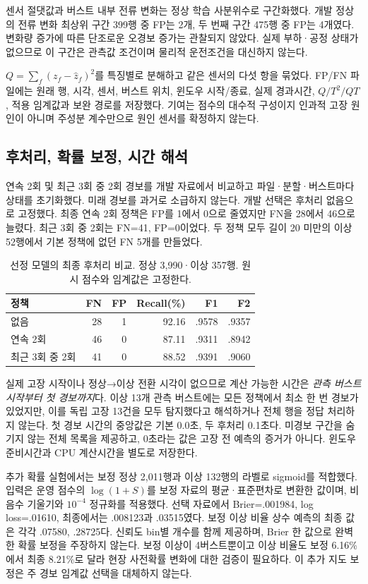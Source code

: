 \documentclass{article}
\begin{document}
센서 절댓값과 버스트 내부 전류 변화는 정상 학습 사분위수로 구간화했다. 개발 정상의 전류 변화 최상위 구간 399행 중 FP는 2개, 두 번째 구간 475행 중 FP는 4개였다. 변화량 증가에 따른 단조로운 오경보 증가는 관찰되지 않았다. 실제 부하·공정 상태가 없으므로 이 구간은 관측값 조건이며 물리적 운전조건을 대신하지 않는다.

$Q=\sum_f(z_f-\hat z_f)^2$를 특징별로 분해하고 같은 센서의 다섯 항을 묶었다. FP/FN 파일에는 원래 행, 시각, 센서, 버스트 위치, 윈도우 시작/종료, 실제 경과시간, $Q/T^2/QT$, 적용 임계값과 보완 경로를 저장했다. 기여는 점수의 대수적 구성이지 인과적 고장 원인이 아니며 주성분 계수만으로 원인 센서를 확정하지 않는다.

\subsection{후처리, 확률 보정, 시간 해석}
연속 2회 및 최근 3회 중 2회 경보를 개발 자료에서 비교하고 파일·분할·버스트마다 상태를 초기화했다. 미래 경보를 과거로 소급하지 않는다. 개발 선택은 후처리 없음으로 고정했다. 최종 연속 2회 정책은 FP를 1에서 0으로 줄였지만 FN을 28에서 46으로 늘렸다. 최근 3회 중 2회는 FN=41, FP=0이었다. 두 정책 모두 길이 20 미만의 이상 52행에서 기본 정책에 없던 FN 5개를 만들었다.

\begin{table}[t]
\caption{선정 모델의 최종 후처리 비교. 정상 3,990·이상 357행. 원시 점수와 임계값은 고정한다.}
\label{tab:post}\centering\small\setlength{\tabcolsep}{4pt}
\begin{tabular}{lrrrrr}\toprule
정책 & FN & FP & Recall(\%) & F1 & F2\\\midrule
없음 &28&1&92.16&.9578&.9357\\
연속 2회 &46&0&87.11&.9311&.8942\\
최근 3회 중 2회 &41&0&88.52&.9391&.9060\\\bottomrule
\end{tabular}
\end{table}

실제 고장 시작이나 정상→이상 전환 시각이 없으므로 계산 가능한 시간은 \emph{관측 버스트 시작부터 첫 경보까지}다. 이상 13개 관측 버스트에는 모든 정책에서 최소 한 번 경보가 있었지만, 이를 독립 고장 13건을 모두 탐지했다고 해석하거나 전체 행을 정답 처리하지 않는다. 첫 경보 시간의 중앙값은 기본 0.0초, 두 후처리 0.1초다. 미경보 구간을 숨기지 않는 전체 목록을 제공하고, 0초라는 값은 고장 전 예측의 증거가 아니다. 윈도우 준비시간과 CPU 계산시간을 별도로 저장한다.

추가 확률 실험에서는 보정 정상 2,011행과 이상 132행의 라벨로 sigmoid를 적합했다. 입력은 운영 점수의 $\log(1+S)$를 보정 자료의 평균·표준편차로 변환한 값이며, 비음수 기울기와 $10^{-4}$ 정규화를 적용했다. 선택 자료에서 Brier=.001984, log loss=.01610, 최종에서는 .008123과 .03515였다. 보정 이상 비율 상수 예측의 최종 값은 각각 .07580, .28725다. 신뢰도 bin별 개수를 함께 제공하며, Brier 한 값으로 완벽한 확률 보정을 주장하지 않는다. 보정 이상이 4버스트뿐이고 이상 비율도 보정 6.16\%에서 최종 8.21\%로 달라 현장 사전확률 변화에 대한 검증이 필요하다. 이 추가 지도 보정은 주 경보 임계값 선택을 대체하지 않는다.
\end{document}

